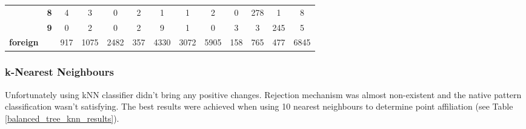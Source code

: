 \begin{table}[htp]
{\begin{tabular}{|c|c|c|c|c|c|c|c|c|c|c|c|c|}
		& \textbf{8} & 4          & 3          & 0          & 2          & 1          & 1          & 2          & 0          & 278        & 1          & 8                \\ \cline{2-13} 
		& \textbf{9} & 0          & 2          & 0          & 2          & 9          & 1          & 0          & 3          & 3          & 245        & 5                \\ \hline
		\textbf{foreign}                    & \textbf{}  & 917        & 1075       & 2482       & 357        & 4330       & 3072       & 5905       & 158        & 765        & 477        & 6845             \\ \hline
	\end{tabular}
}
\end{table}

\subsubsection{k-Nearest Neighbours}

Unfortunately using kNN classifier didn't bring any positive changes. Rejection mechanism was almost non-existent and the native pattern classification wasn't satisfying. The best results were achieved when using 10 nearest neighbours to determine point affiliation (see Table \ref{balanced_tree_knn_results}).


